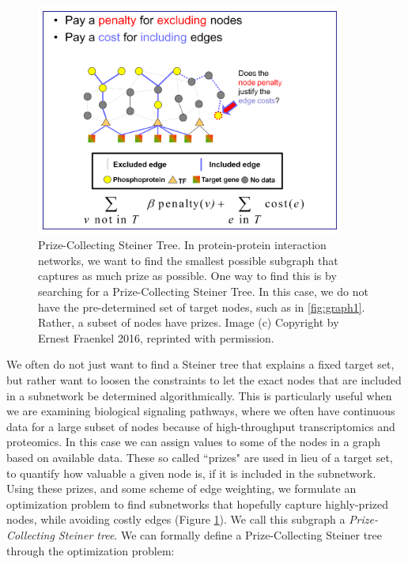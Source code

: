 \documentclass[12pt,twoside]{reedthesis}
\theoremstyle{definition}
\begin{document}
  \begin{figure}[!h]
    \begin{center}
      \includegraphics[width=4in]{PCST}
    \caption[Prize-Collecting Steiner Tree.]{Prize-Collecting Steiner Tree. In protein-protein interaction networks, we want to find the smallest possible subgraph that captures as much prize as possible. One way to find this is by searching for a Prize-Collecting Steiner Tree. In this case, we do not have the pre-determined set of target nodes, such as in \ref{fig:graph1}. Rather, a subset of nodes have prizes. Image (c) Copyright by Ernest Fraenkel 2016, reprinted with permission.}
    \label{fig:PCST}
    \end{center}
  \end{figure}

  We often do not just want to find a Steiner tree that explains a fixed target set, but rather want to loosen the constraints to let the exact nodes that are included in a subnetwork be determined algorithmically. This is particularly useful when we are examining biological signaling pathways, where we often have continuous data for a large subset of nodes because of high-throughput transcriptomics and proteomics. In this case we can assign values to some of the nodes in a graph based on available data. These so called ``prizes" are used in lieu of a target set, to quantify how valuable a given node is, if it is included in the subnetwork. Using these prizes, and some scheme of edge weighting, we formulate an optimization problem to find subnetworks that hopefully capture highly-prized nodes, while avoiding costly edges (Figure \ref{fig:PCST}). We call this subgraph a \textit{Prize-Collecting Steiner tree}. We can formally define a Prize-Collecting Steiner tree through the optimization problem:\par
\end{document}

